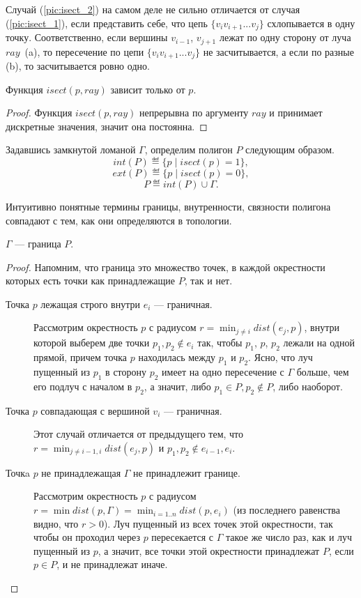 Случай (\ref{pic:isect_2}) на самом деле не сильно отличается от случая (\ref{pic:isect_1}), если представить себе, что 
цепь $\{v_iv_{i+1}...v_j\}$ схлопывается в одну точку. Соответственно, если вершины $v_{i-1}$, $v_{j+1}$ лежат по одну сторону 
от луча $ray$~(a), то пересечение по цепи $\{v_iv_{i+1}...v_j\}$ не засчитывается, а если по разные (b), 
то засчитывается ровно одно.

\begin{statement}
Функция $isect(p, ray)$ зависит только от $p$. 
\begin{proof}
Функция $isect(p, ray)$ непрерывна по аргументу $ray$ и принимает дискретные значения, значит она постоянна.
\end{proof}
\end{statement}

\begin{definition} Задавшись замкнутой ломаной $\Gamma$, определим полигон $P$ следующим образом. \\
$$int(P) \eqdef \{ p \; | \; isect(p) = 1 \},$$
$$ext(P) \eqdef \{ p \; | \; isect(p) = 0 \},$$
$$P \eqdef int(P) \cup \Gamma.$$
\end{definition}

Интуитивно понятные термины границы, внутренности, связности полигона совпадают с тем, как они определяются в топологии.

\begin{statement}
\label{stat:Bounds}
$\Gamma$ --- граница $P$.
\begin{proof} 
    Напомним, что граница это множество точек, в каждой окрестности которых есть точки как принадлежащие $P$, так и нет.
    \begin{description}
        \item [Точка $p$ лежащая строго внутри $e_i$ --- граничная.] 
            Рассмотрим окрестность $p$ с радиусом $r = \min_{j \neq i}{dist(e_j, p)}$, внутри которой выберем две точки 
            $p_1, p_2 \notin e_i$  так, чтобы $p_1$, $p$, $p_2$ лежали на одной прямой, причем точка $p$ находилась между 
            $p_1$ и $p_2$. Ясно, что луч пущенный из $p_1$ в сторону $p_2$ имеет на одно пересечение с $\Gamma$ больше, 
            чем его подлуч с началом в $p_2$, а значит, либо $p_1 \in P, p_2 \notin P$, либо наоборот.
        \item [Точка $p$ совпадающая с вершиной $v_i$ --- граничная.] Этот случай отличается от предыдущего тем, что
            $r = \min_{j \neq i - 1, i}{dist(e_j, p)}$ и $p_1, p_2 \notin e_{i-1}, e_i$.
        \item [Точкa $p$ не принадлежащая $\Gamma$ не принадлежит границе.] Рассмотрим окрестность $p$ с радиусом 
            $r = \min dist(p, \Gamma) = \min_{i=1..n}{dist(p, e_i)}$ (из последнего равенства видно, что $r > 0$). 
            Луч пущенный из всех точек этой окрестности, так чтобы он проходил через $p$ пересекается с $\Gamma$ такое же число 
            раз, как и луч пущенный из $p$, а значит, все точки этой окрестности принадлежат $P$, если $p \in P$, 
            и не принадлежат иначе.
    \end{description}
\end{proof}
\end{statement}

